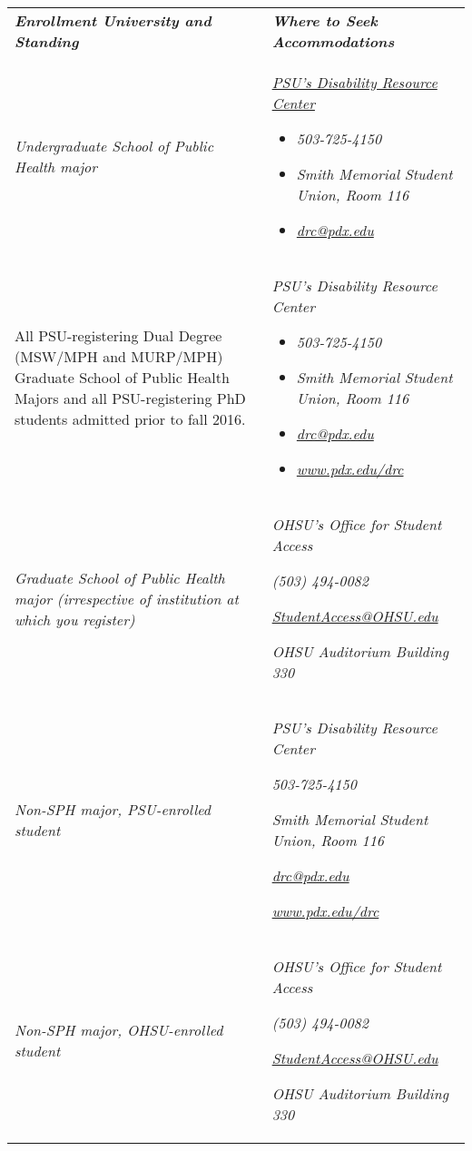 \documentclass[
  letterpaper,
  DIV=11,
  numbers=noendperiod]{scrartcl}
\begin{document}
\begin{longtable}[]{@{}
  >{\raggedright\arraybackslash}p{}
  >{\raggedright\arraybackslash}p{}@{}}
\toprule\noalign{}
\endhead
\bottomrule\noalign{}
\endlastfoot
\textbf{\emph{Enrollment University and Standing}} & \textbf{\emph{Where
to Seek Accommodations}} \\
\emph{Undergraduate School of Public Health major} &
\begin{minipage}[t]{\linewidth}\raggedright
\href{http://www.pdx.edu/drc}{\emph{PSU's Disability Resource Center}}

\begin{itemize}
\item
  \emph{503-725-4150}
\item
  \emph{Smith Memorial Student Union, Room 116}
\item
  \href{mailto:drc@pdx.edu}{\emph{drc@pdx.edu}}
\end{itemize}
\end{minipage} \\
All PSU-registering Dual Degree (MSW/MPH and MURP/MPH) Graduate School
of Public Health Majors and all PSU-registering PhD students admitted
prior to fall 2016. & \begin{minipage}[t]{\linewidth}\raggedright
\emph{PSU's Disability Resource Center}

\begin{itemize}
\item
  \emph{503-725-4150}
\item
  \emph{Smith Memorial Student Union, Room 116}
\item
  \href{mailto:drc@pdx.edu}{\emph{drc@pdx.edu}}
\item
  \href{http://www.pdx.edu/drc}{\emph{www.pdx.edu/drc}}
\end{itemize}
\end{minipage} \\
\emph{Graduate School of Public Health major (irrespective of
institution at which you register)} & \emph{OHSU's Office for Student
Access}

\emph{(503) 494-0082}

\href{mailto:StudentAccess@OHSU.edu}{\emph{StudentAccess@OHSU.edu}}

\emph{OHSU Auditorium Building 330} \\
\emph{Non-SPH major, PSU-enrolled student} & \emph{PSU's Disability
Resource Center}

\emph{503-725-4150}

\emph{Smith Memorial Student Union, Room 116}

\href{mailto:drc@pdx.edu}{\emph{drc@pdx.edu}}

\href{http://www.pdx.edu/drc}{\emph{www.pdx.edu/drc}} \\
\emph{Non-SPH major, OHSU-enrolled student} & \emph{OHSU's Office for
Student Access}

\emph{(503) 494-0082}

\href{mailto:StudentAccess@OHSU.edu}{\emph{StudentAccess@OHSU.edu}}

\emph{OHSU Auditorium Building 330} \\
\end{longtable}
\end{document}
